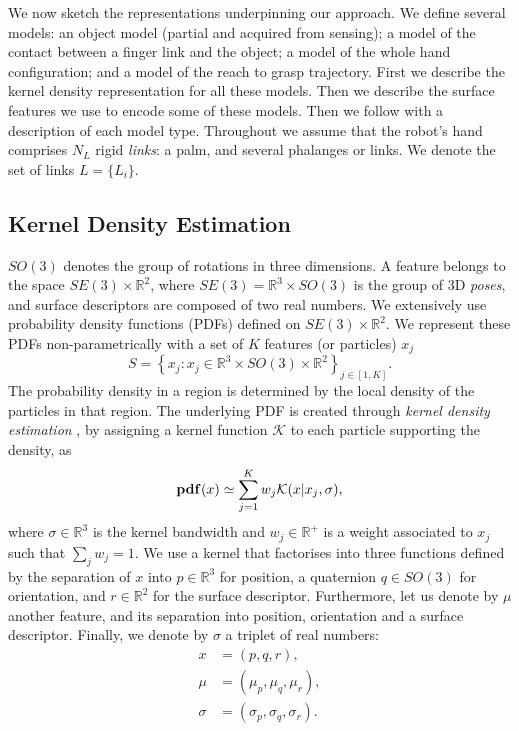 We now sketch the representations underpinning our approach. We define several models: an object model (partial and acquired from sensing); a model of the contact between a finger link and the object; a model of the whole hand configuration; and a model of the reach to grasp trajectory. First we describe the kernel density representation for all these models. Then we describe the surface features we use to encode some of these models. Then we follow with a description of each model type. Throughout we assume that the robot's hand comprises $N_L$ rigid \emph{links}: a palm, and several phalanges or links. We denote the set of links $L =\{L_i\}$. 

\subsection{Kernel Density Estimation}
\label{sec:kde}
$SO(3)$ denotes the group of rotations in three dimensions. A feature belongs to the space $SE(3) \times \mathbb R^2$, where $SE(3) = \mathbb R^3 \times SO(3)$ is the group of 3D \emph{poses}, and surface descriptors are composed of two real numbers. We extensively use probability density functions (PDFs) defined on $SE(3) \times \mathbb R^2$.  We represent these PDFs non-parametrically with a set of $K$ features (or particles) $x_j$
\begin{equation}
S = \left\lbrace x_j : x_j \in \mathbb R^3 \times SO(3) \times \mathbb R^2 \right\rbrace_{j \in [1,K]}.
\end{equation}
The probability density in a region is determined by the local density of the particles in that region. The underlying PDF is created through \emph{kernel density estimation} \cite{silverman1986a}, by assigning a kernel function $\mathcal{K}$ to each particle supporting the density, as
\begin{equation}\label{eq:d}
\mathbf{pdf}(x) \simeq \sum_{j=1}^K w_j \mathcal{K}(x| x_{j}, \sigma),
\end{equation}
where  $\sigma \in \mathbb R^3$ is the kernel bandwidth and $w_j \in \mathbb R^{+}$ is a weight associated to $x_j$ such that $\sum_j w_j = 1$. We use a kernel that factorises into three functions defined by the separation of $x$ into $p \in \mathbb R^3$ for position, a quaternion $q \in SO(3)$ for orientation, and $r \in \mathbb R^2$ for the surface descriptor. Furthermore, let us denote by $\mu$ another feature, and its separation into position, orientation and a surface descriptor. Finally, we denote by $\sigma$ a triplet of real numbers:
\begin{subequations}
\begin{align}
x &= (p, q, r),\\
\mu &= (\mu_p, \mu_q, \mu_r),\\
\sigma &= (\sigma_p, \sigma_q, \sigma_r).
\end{align}
\label{eq:feature}
\end{subequations}
